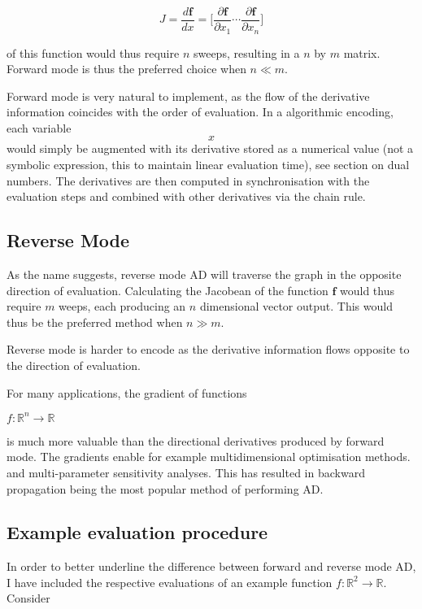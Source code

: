 \documentclass[11pt]{article}
\begin{document}
\[ J = \frac{d\mathbf {f}}{dx} = \Big[ \frac{\partial \mathbf {f}}{\partial x_1} \cdots \frac{\partial \mathbf {f}}{\partial x_n}   \Big] \]

of this function would thus require $ n $ sweeps, resulting in a $ n $ by $ m $ matrix. Forward mode is thus the preferred choice when $ n \ll m $. 

Forward mode is very natural to implement, as the flow of the derivative information coincides with the order of evaluation. In a algorithmic encoding, each variable $$ x $$ would simply be augmented with its derivative stored as a numerical value (not a symbolic expression, this to maintain linear evaluation time), see section on dual numbers. The derivatives are then computed in synchronisation with the evaluation steps and combined with other derivatives via the chain rule. 

\subsection{Reverse Mode}

As the name suggests, reverse mode AD will traverse the graph in the opposite direction of evaluation. Calculating the Jacobean of the function $ \mathbf{f} $ would thus require $ m $ weeps, each producing an $ n $ dimensional vector output. This would thus be the preferred method when $ n \gg m $. 

Reverse mode is harder to encode as the derivative information flows opposite to the direction of evaluation. 

For many applications, the gradient of functions 

$ f: \mathbb{R}^n \rightarrow \mathbb{R}$

is much more valuable than the directional derivatives produced by forward mode. The gradients enable for example multidimensional optimisation methods. and multi-parameter sensitivity analyses. This has resulted in backward propagation being the most popular method of performing AD. 

\subsection{Example evaluation procedure}

In order to better underline the difference between forward and reverse mode AD, I have included the respective evaluations of an example function $ f:\mathbb{R}^2 \rightarrow \mathbb{R} $. Consider 
\end{document}
